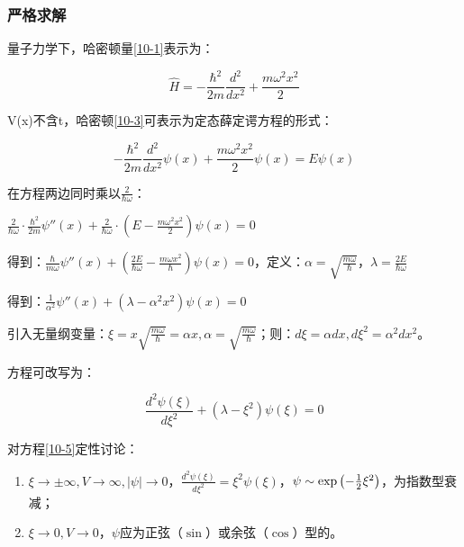 \subsubsection{严格求解}

量子力学下，哈密顿量\ref{10-1}表示为：

\begin{equation}\label{10-3}
\hat H =  - \frac{{\hbar ^2 }}{{2m}}\frac{{d^2 }}{{dx^2 }} + \frac{{m\omega ^2 x^2 }}{2}
\end{equation}

V(x)不含t，哈密顿\ref{10-3}可表示为定态薛定谔方程的形式：

\begin{equation}\label{10-4}
 - \frac{{\hbar ^2 }}{{2m}}\frac{{d^2 }}{{dx^2 }}\psi (x) + \frac{{m\omega ^2 x^2 }}{2}\psi (x) = E\psi (x)
\end{equation}

在方程两边同时乘以$\frac{2}{{\hbar \omega }}$：

\begin{center}
$\frac{2}{{\hbar \omega }} \cdot \frac{{\hbar ^2 }}{{2m}}\psi ''(x) + \frac{2}{{\hbar \omega }} \cdot \left( {E - \frac{{m\omega ^2 x^2 }}{2}} \right)\psi (x) = 0$
\end{center}

得到：$\frac{\hbar }{{m\omega }}\psi ''(x) + \left( {\frac{{2E}}{{\hbar \omega }} - \frac{{m\omega x^2 }}{\hbar }} \right)\psi (x) = 0$，定义：$\alpha  = \sqrt {\frac{{m\omega }}{\hbar }} $，$\lambda  = \frac{{2E}}{{\hbar \omega }}$

得到：$\frac{1}{{\alpha ^2 }}\psi ''(x) + \left( {\lambda  - \alpha ^2 x^2 } \right)\psi (x) = 0$

引入无量纲变量：$\xi  = x\sqrt {\frac{{m\omega }}{\hbar }}  = \alpha x,\alpha  = \sqrt {\frac{{m\omega }}{\hbar }} $；则：$d\xi  = \alpha dx,d\xi ^2  = \alpha ^2 dx^2 $。

方程可改写为：

\begin{equation}\label{10-5}
\frac{{d^2 \psi (\xi )}}{{d\xi ^2 }} + \left( {\lambda  - \xi ^2 } \right)\psi (\xi ) = 0
\end{equation}

对方程\ref{10-5}定性讨论：

\begin{enumerate}
    \item $\xi  \to  \pm \infty ,V \to \infty ,\left| \psi  \right| \to 0$，$\frac{{d^2 \psi (\xi )}}{{d\xi ^2 }} = \xi ^2 \psi (\xi )$，$\psi  \sim \exp \left( { - {\textstyle{1 \over 2}}\xi ^2 } \right)$，为指数型衰减；
    \item $\xi  \to 0,V \to 0$，$\psi$应为正弦（$\sin$）或余弦（$\cos$）型的。
   \end{enumerate}


